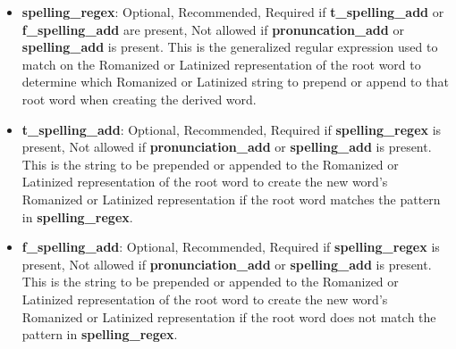 \begin{itemize}
	\item \textbf{spelling\_regex}: Optional, Recommended, Required if \textbf{t\_spelling\_add} or \textbf{f\_spelling\_add} are present, Not allowed if \textbf{pronuncation\_add} or \textbf{spelling\_add} is present.  This is the generalized regular expression used to match on the Romanized or Latinized representation of the root word to determine which Romanized or Latinized string to prepend or append to that root word when creating the derived word.
	\item \textbf{t\_spelling\_add}: Optional, Recommended, Required if \textbf{spelling\_regex} is present, Not allowed if \textbf{pronunciation\_add} or \textbf{spelling\_add} is present.  This is the string to be prepended or appended to the Romanized or Latinized representation of the root word to create the new word's Romanized or Latinized representation if the root word matches the pattern in \textbf{spelling\_regex}.
	\item \textbf{f\_spelling\_add}: Optional, Recommended, Required if \textbf{spelling\_regex} is present, Not allowed if \textbf{pronunciation\_add} or \textbf{spelling\_add} is present.  This is the string to be prepended or appended to the Romanized or Latinized representation of the root word to create the new word's Romanized or Latinized representation if the root word does not match the pattern in \textbf{spelling\_regex}.
	
\end{itemize}


